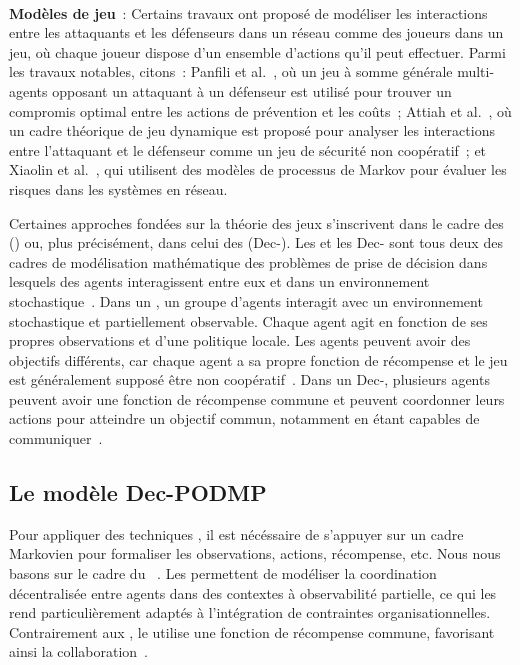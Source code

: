 \

\noindent
\textbf{Modèles de jeu}~: \quad Certains travaux ont proposé de modéliser les interactions entre les attaquants et les défenseurs dans un réseau comme des joueurs dans un jeu, où chaque joueur dispose d'un ensemble d'actions qu'il peut effectuer.
Parmi les travaux notables, citons~: Panfili et al.~\cite{MPanfili2018}, où un jeu à somme générale multi-agents opposant un attaquant à un défenseur est utilisé pour trouver un compromis optimal entre les actions de prévention et les coûts~; Attiah et al.~\cite{AAttiah2018}, où un cadre théorique de jeu dynamique est proposé pour analyser les interactions entre l'attaquant et le défenseur comme un jeu de sécurité non coopératif~; et Xiaolin et al.~\cite{CXiaolin2008}, qui utilisent des modèles de processus de Markov pour évaluer les risques dans les systèmes en réseau.

\noindent
Certaines approches fondées sur la théorie des jeux s'inscrivent dans le cadre des  () ou, plus précisément, dans celui des  (Dec-). Les  et les Dec- sont tous deux des cadres de modélisation mathématique des problèmes de prise de décision dans lesquels des agents interagissent entre eux et dans un environnement stochastique~\cite{beynier2010}. Dans un , un groupe d'agents interagit avec un environnement stochastique et partiellement observable. Chaque agent agit en fonction de ses propres observations et d'une politique locale. Les agents peuvent avoir des objectifs différents, car chaque agent a sa propre fonction de récompense et le jeu est généralement supposé être non coopératif~\cite{terry2020pettingzoo}. Dans un Dec-, plusieurs agents peuvent avoir une fonction de récompense commune et peuvent coordonner leurs actions pour atteindre un objectif commun, notamment en étant capables de communiquer~\cite{bernstein2013}.



\subsection{Le modèle Dec-PODMP}

Pour appliquer des techniques , il est nécéssaire de s'appuyer sur un cadre Markovien pour formaliser les observations, actions, récompense, etc. Nous nous basons sur le cadre du ~\cite{Oliehoek2016}. Les  permettent de modéliser la coordination décentralisée entre agents dans des contextes à observabilité partielle, ce qui les rend particulièrement adaptés à l'intégration de contraintes organisationnelles. Contrairement aux , le  utilise une fonction de récompense commune, favorisant ainsi la collaboration~\cite{Beynier2013}.


